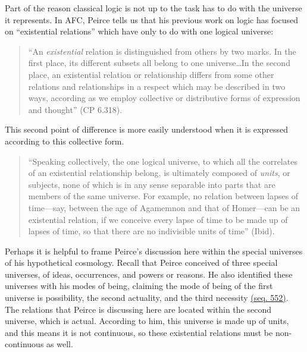 Part of the reason classical logic is not up to the task has to do with the universe it represents. In AFC, Peirce tells us that his previous work on logic has focused on ``existential relations'' which have only to do with one logical universe: \begin{quotation}\noindent``An \textit{existential} relation is distinguished from others by two marks. In the first place, its different subsets all belong to one universe\dots In the second place, an existential relation or relationship differs from some other relations and relationships in a respect which may be described in two ways, according as we employ collective or distributive forms of expression and thought'' (CP 6.318).\end{quotation} This second point of difference is more easily understood when it is expressed according to this collective form. \begin{quotation}\noindent``Speaking collectively, the one logical universe, to which all the correlates of an existential relationship belong, is ultimately composed of \textit{units}, or subjects, none of which is in any sense separable into parts that are members of the same universe. For example, no relation between lapses of time---say, between the age of Agamemnon and that of Homer---can be an existential relation, if we conceive every lapse of time to be made up of lapses of time, so that there are no indivisible units of time'' (Ibid).\end{quotation} Perhaps it is helpful to frame Peirce's discussion here within the special universes of his hypothetical cosmology. Recall that Peirce conceived of three special universes, of ideas, occurrences, and powers or reasons. He also identified these universes with his modes of being, claiming the mode of being of the first universe is possibility, the second actuality, and the third necessity \href{https://iiif.lib.harvard.edu/manifests/view/drs:15255301$552i}{(seq. 552)}. The relations that Peirce is discussing here are located within the second universe, which is actual. According to him, this universe is made up of units, and this means it is not continuous, so these existential relations must be non-continuous as well.

